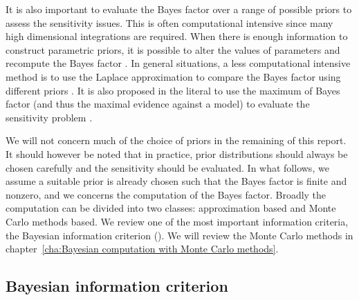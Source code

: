 It is also important to evaluate the Bayes factor over a range of possible
priors to assess the sensitivity issues. This is often computational intensive
since many high dimensional integrations are required. When there is enough
information to construct parametric priors, it is possible to alter the values
of parameters and recompute the Bayes factor
\parencite[e.g.,][]{McCulloch1991}. In general situations, a less
computational intensive method is to use the Laplace approximation to compare
the Bayes factor using different priors \parencite[e.g.,][]{Kass1992}. It is
also proposed in the literal to use the maximum of Bayes factor (and thus the
maximal evidence against a model) to evaluate the sensitivity problem
\parencite[e.g.,][]{Berger1987}.

We will not concern much of the choice of priors in the remaining of this
report. It should however be noted that in practice, prior distributions
should always be chosen carefully and the sensitivity should be evaluated. In
what follows, we assume a suitable prior is already chosen such that the Bayes
factor is finite and nonzero, and we concerns the computation of the Bayes
factor. Broadly the computation can be divided into two classes: approximation
based and Monte Carlo methods based. We review one of the most important
information criteria, the Bayesian information criterion (\bic). We will
review the Monte Carlo methods in chapter~\ref{cha:Bayesian computation with
  Monte Carlo methods}.

\subsection{Bayesian information criterion}
\label{sub:Bayesian information criterion}

